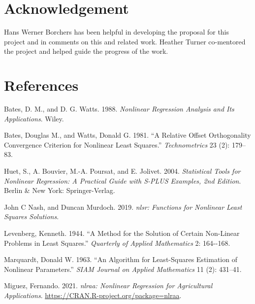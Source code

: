 \documentclass[
]{article}
\newlength{\cslhangindent}
\newlength{\cslentryspacingunit} %
\newenvironment{CSLReferences}[2] %
 {%
  \setlength{\parindent}{0pt}
  \ifodd #1
  \let\oldpar\par
  \def\par{\hangindent=\cslhangindent\oldpar}
  \fi
  \setlength{\parskip}{#2\cslentryspacingunit}
 }%
 {}
\begin{document}
\hypertarget{acknowledgement}{%
\section{Acknowledgement}\label{acknowledgement}}

Hans Werner Borchers has been helpful in developing the proposal for
this project and in comments on this and related work. Heather Turner
co-mentored the project and helped guide the progress of the work.

\hypertarget{references}{%
\section*{References}\label{references}}

\hypertarget{refs}{}
\begin{CSLReferences}{1}{0}
\leavevmode{}%
Bates, D. M., and D. G. Watts. 1988. \emph{Nonlinear Regression Analysis
and Its Applications}. Wiley.

\leavevmode{}%
Bates, Douglas M., and Watts, Donald G. 1981. {``A Relative Offset
Orthogonality Convergence Criterion for Nonlinear Least Squares.''}
\emph{Technometrics} 23 (2): 179--83.

\leavevmode{}%
Huet, S., A. Bouvier, M.-A. Poursat, and E. Jolivet. 2004.
\emph{Statistical Tools for Nonlinear Regression: A Practical Guide with
{S-PLUS} Examples, 2nd Edition}. Berlin \& New York: Springer-Verlag.

\leavevmode{}%
John C Nash, and Duncan Murdoch. 2019. \emph{{nlsr: Functions for
Nonlinear Least Squares Solutions}}.

\leavevmode{}%
Levenberg, Kenneth. 1944. {``A Method for the Solution of Certain
Non-Linear Problems in Least Squares.''} \emph{Quarterly of Applied
Mathematics} 2: 164-\/-168.

\leavevmode{}%
Marquardt, Donald W. 1963. {``{An Algorithm for Least-Squares Estimation
of Nonlinear Parameters}.''} \emph{SIAM Journal on Applied Mathematics}
11 (2): 431--41.

\leavevmode{}%
Miguez, Fernando. 2021. \emph{{nlraa: Nonlinear Regression for
Agricultural Applications}}.
\url{https://CRAN.R-project.org/package=nlraa}.


\end{CSLReferences}
\end{document}
